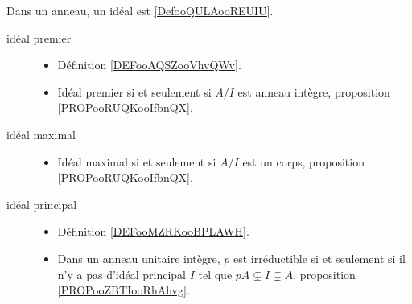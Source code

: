 Dans un anneau, un idéal est \ref{DefooQULAooREUIU}.
\begin{description}
	\item[idéal premier]\hspace{1cm}
	\begin{itemize}
		\item
		      Définition \ref{DEFooAQSZooVhvQWv}.
		\item Idéal premier si et seulement si \( A/I\) est anneau intègre, proposition \ref{PROPooRUQKooIfbnQX}.
	\end{itemize}
	\item[idéal maximal]\hspace{1cm}
	\begin{itemize}
		\item
		      Idéal maximal si et seulement si \( A/I\) est un corps, proposition \ref{PROPooRUQKooIfbnQX}.
	\end{itemize}
	\item[idéal principal]\hspace{1cm}
	\begin{itemize}
		\item
		      Définition \ref{DEFooMZRKooBPLAWH}.
		\item
		      Dans un anneau unitaire intègre, \( p\) est irréductible si et seulement si il n'y a pas d'idéal principal \( I\) tel que \( pA\subsetneq I\subsetneq A\), proposition \ref{PROPooZBTIooRhAhvg}.
	\end{itemize}
\end{description}
